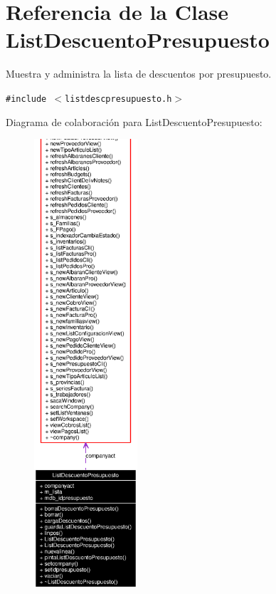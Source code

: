 \section{Referencia de la Clase List\-Descuento\-Presupuesto}
\label{classListDescuentoPresupuesto}
Muestra y administra la lista de descuentos por presupuesto.  


{\tt \#include $<$listdescpresupuesto.h$>$}

Diagrama de colaboraci\'{o}n para List\-Descuento\-Presupuesto:\begin{figure}[H]
\begin{center}
\leavevmode
\includegraphics[width=109pt]{classListDescuentoPresupuesto__coll__graph}
\end{center}
\end{figure}
